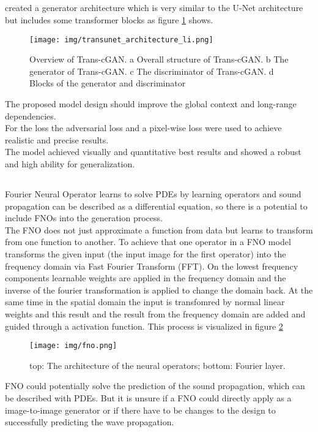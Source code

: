 		\subsection{}
			\citeauthor{li_trans-cgan_2023} created a generator architecture which is very similar to the U-Net architecture but includes some transformer blocks as figure \ref{fig:transcgan} shows.
			\begin{figure}[H]
				\centering
				\texttt{[image: img/transunet\_architecture\_li.png]}
				\caption[Trans-cGAN Architecture]{Overview of Trans-cGAN. a Overall structure of Trans-cGAN. b The generator of Trans-cGAN. c The discriminator of Trans-cGAN. d Blocks of the generator and discriminator}
				\label{fig:transcgan}
			\end{figure}
			\FloatBarrier
			The proposed model design should improve the global context and long-range dependencies.\\
			For the loss the adversarial loss and a pixel-wise loss were used to achieve realistic and precise results.\\
			The model achieved visually and quantitative best results and showed a robust and high ability for generalization.
			
		\subsection{}
			Fourier Neural Operator learns to solve PDEs by learning operators and sound propagation can be described as a differential equation, so there is a potential to include FNOs into the generation process.\\
			The FNO does not just approximate a function from data but learns to transform from one function to another. To achieve that one operator in a FNO model transforms the given input (the input image for the first operator) into the frequency domain via Fast Fourier Transform (FFT). On the lowest frequency components learnable weights are applied in the frequency domain and the inverse of the fourier transformation is applied to change the domain back. At the same time in the spatial domain the input is transfomred by normal linear weights and  this result and the result from the frequency domain are added and guided through a activation function. This process is visualized in figure \ref{fig:fno}
			\begin{figure}[H]
				\centering
				\texttt{[image: img/fno.png]}
				\caption[FNO Architecture]{top: The architecture of the neural operators; bottom: Fourier layer.}
				\label{fig:fno}
			\end{figure}
			FNO could potentially solve the prediction of the sound propagation, which can be described with PDEs. But it is unsure if a FNO could directly apply as a image-to-image generator or if there have to be changes to the design to successfully predicting the wave propagation.
			
